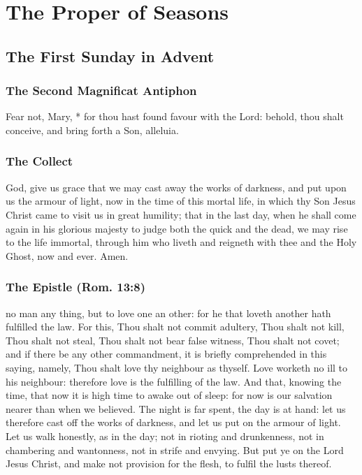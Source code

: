\section{The Proper of Seasons}
\subsection{The First Sunday in Advent}
\subsubsection{The Second Magnificat Antiphon}
Fear not, Mary, * for thou hast found favour with the Lord: behold, thou shalt conceive, and bring forth a Son, alleluia.
\subsubsection{The Collect}
 God, give us grace that we may cast away the works of darkness, and put upon us the armour of light, now in the time of this mortal life, in which thy Son Jesus Christ came to visit us in great humility; that in the last day, when he shall come again in his glorious majesty to judge both the quick and the dead, we may rise to the life immortal, through him who liveth and reigneth with thee and the Holy Ghost, now and ever. Amen.
\subsubsection{The Epistle (Rom. 13:8)}
 no man any thing, but to love one an other: for he that loveth another hath fulfilled the law. For this, Thou shalt not commit adultery, Thou shalt not kill, Thou shalt not steal, Thou shalt not bear false witness, Thou shalt not covet; and if there be any other commandment, it is briefly comprehended in this saying, namely, Thou shalt love thy neighbour as thyself. Love worketh no ill to his neighbour: therefore love is the fulfilling of the law. And that, knowing the time, that now it is high time to awake out of sleep: for now is our salvation nearer than when we believed. The night is far spent, the day is at hand: let us therefore cast off the works of darkness, and let us put on the armour of light. Let us walk honestly, as in the day; not in rioting and drunkenness, not in chambering and wantonness, not in strife and envying. But put ye on the Lord Jesus Christ, and make not provision for the flesh, to fulfil the lusts thereof.
